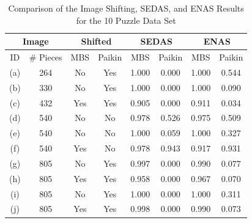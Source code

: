 \begin{table}[tb]
\begin{center}
\begin{tabular}{ c|c||c|c||c|c||c|c } 
 \toprule
 \multicolumn{2}{c||}{Image} & \multicolumn{2}{c||}{Shifted} & \multicolumn{2}{c||}{SEDAS} & \multicolumn{2}{c}{ENAS} \\
\hline
 ID  & \# Pieces & MBS & Paikin & MBS & Paikin & MBS & Paikin  \\ 
\hline \hline
 (a) &  264     & No  & Yes & 1.000  & 0.000 & 1.000 & 0.544 \\ 
\hline
 (b) &  330     & No  & Yes & 1.000  & 0.000 & 1.000 &  0.090 \\ 
\hline
 (c) &  432     & Yes & Yes & 0.905 &  0.000 & 0.911 & 0.034 \\  
\hline
 (d) &  540     & No  & No  & 0.978 & 0.526 & 0.975 & 0.509 \\ 
\hline
 (e) &  540     & No  & No  & 1.000  &  0.059 & 1.000  & 0.327 \\ 
\hline
 (f) &  540     & Yes & No  & 0.978 & 0.943 & 0.917 & 0.931 \\ 
\hline
 (g) &  805     & No  & Yes & 0.997 &  0.000 & 0.990 &  0.077 \\ 
\hline
 (h) &  805     & Yes & Yes & 0.958 &  0.000   & 0.967 &  0.070 \\ 
\hline
 (i) &  805     & No  & Yes & 1.000  &  0.000   & 1.000  &  0.311 \\ 
\hline
 (j) &  805     & Yes & Yes & 0.998 &  0.000   & 0.990 &   0.073 \\ 
 \bottomrule
\end{tabular}
\end{center}
\caption{Comparison of the Image Shifting, SEDAS, and ENAS Results for the 10 Puzzle Data Set}\label{tab:pomeranzBestBuddiesVisualizations}
\end{table}